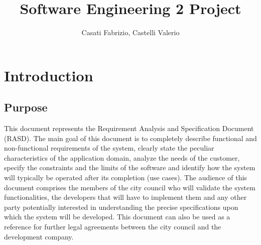 \documentclass{book}
\begin{document}
\title{Software Engineering 2 Project}
\author{Casati Fabrizio, Castelli Valerio}

\maketitle
\tableofcontents

\chapter{Introduction}
\section{Purpose}
This document represents the Requirement Analysis and Specification Document (RASD). The main goal of this document is to completely describe functional and non-functional requirements of the system, clearly state the peculiar characteristics of the application domain, analyze the needs of the customer, specify the constraints and the limits of the software and identify how the system will typically be operated after its completion (use cases). The audience of this document comprises the members of the city council who will validate the system functionalities, the developers that will have to implement them and any other party potentially interested in understanding the precise specifications upon which the system will be developed. This document can also be used as a reference for further legal agreements between the city council and the development company.
\end{document}
